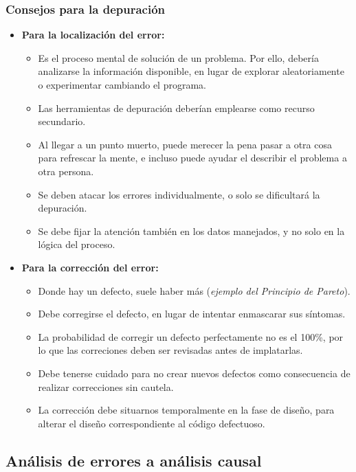 \subsubsection{Consejos para la depuración}

\begin{itemize}
    \item \textbf{Para la localización del error:}
    \begin{itemize}
        \item Es el proceso mental de solución de un problema. Por ello, debería analizarse la información disponible, en lugar de explorar aleatoriamente o experimentar cambiando el programa.
        \item Las herramientas de depuración deberían emplearse como recurso secundario.
        \item Al llegar a un punto muerto, puede merecer la pena pasar a otra cosa para refrescar la mente, e incluso puede ayudar el describir el problema a otra persona.
        \item Se deben atacar los errores individualmente, o solo se dificultará la depuración.
        \item Se debe fijar la atención también en los datos manejados, y no solo en la lógica del proceso.
    \end{itemize}

    \item \textbf{Para la corrección del error:}
    \begin{itemize}
        \item Donde hay un defecto, suele haber más (\textit{ejemplo del Principio de Pareto}).
        \item Debe corregirse el defecto, en lugar de intentar enmascarar sus síntomas.
        \item La probabilidad de corregir un defecto perfectamente no es el 100\%, por lo que las correciones deben ser revisadas antes de implatarlas.
        \item Debe tenerse cuidado para no crear nuevos defectos como consecuencia de realizar correcciones sin cautela.
        \item La corrección debe situarnos temporalmente en la fase de diseño, para alterar el diseño correspondiente al código defectuoso.
    \end{itemize}
\end{itemize}

\subsection{Análisis de errores a análisis causal}

